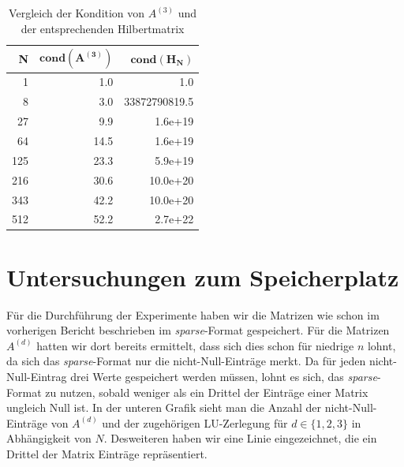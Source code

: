 \documentclass{scrartcl}
\begin{document}
\begin{table}[ht!]
\centering
\begin{tabular}{|r|r|r|}
\hline
\textbf{N} & $\mathbf{cond(A^{(3)})}$ & $\mathbf{cond(H_N)}$       \\ \hline
1          & 1.0                       & 1.0                    \\ \hline
8          & 3.0                       & 33872790819.5      \\ \hline
27         & 9.9                       & 1.6e+19 \\ \hline
64         & 14.5                      & 1.6e+19 \\ \hline
125        & 23.3                      & 5.9e+19  \\ \hline
216        & 30.6                      & 10.0e+20   \\ \hline
343        & 42.2                      & 10.0e+20  \\ \hline
512        & 52.2                      & 2.7e+22   \\ \hline
\end{tabular}
\caption{Vergleich der Kondition von $A^{(3)}$ und der entsprechenden Hilbertmatrix}
\end{table}

\pagebreak
\section{Untersuchungen zum Speicherplatz}
Für die Durchführung der Experimente haben wir die Matrizen wie schon im vorherigen Bericht beschrieben im \textit{sparse}-Format gespeichert.
Für die Matrizen $A^{(d)}$ hatten wir dort bereits ermittelt, dass sich dies schon für niedrige $n$ lohnt, da sich das \textit{sparse}-Format nur die nicht-Null-Einträge merkt.
Da für jeden nicht-Null-Eintrag drei Werte gespeichert werden müssen, lohnt es sich, das \textit{sparse}-Format zu nutzen, sobald weniger als ein Drittel der Einträge einer Matrix ungleich Null ist.
In der unteren Grafik sieht man die Anzahl der nicht-Null-Einträge von $A^{(d)}$ und der zugehörigen LU-Zerlegung für $d\in\{1, 2, 3\}$ in Abhängigkeit von $N$.
Desweiteren haben wir eine Linie eingezeichnet, die ein Drittel der Matrix Einträge repräsentiert.
\end{document}
